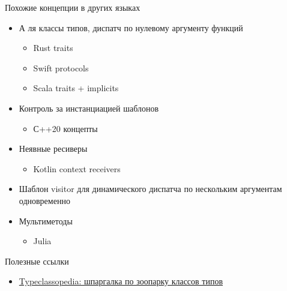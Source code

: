     \begin{frame}[fragile]{Похожие концепции в других языках \popslide}
        \begin{itemize}
            \item А ля классы типов, диспатч по нулевому аргументу функций
            \begin{itemize}
                \item[\eg] Rust traits
                \item[\eg] Swift protocols
                \item[\eg] Scala traits + implicits
            \end{itemize}
            \item Контроль за инстанциацией шаблонов
            \begin{itemize}
                \item[\eg] С++20 концепты
            \end{itemize}
            \item Неявные ресиверы
            \begin{itemize}
                \item[\eg] Kotlin context receivers
            \end{itemize}
            \item Шаблон visitor для динамического диспатча по нескольким аргументам одновременно
            \item Мультиметоды
            \begin{itemize}
                \item[\eg] Julia
            \end{itemize}
        \end{itemize}
    \end{frame}


    \begin{frame}{Полезные ссылки}
        \begin{itemize}
            \item \href{https://wiki.haskell.org/Typeclassopedia}{\color{blue} Typeclassopedia: шпаргалка по зоопарку классов типов}
        \end{itemize}
    \end{frame}

